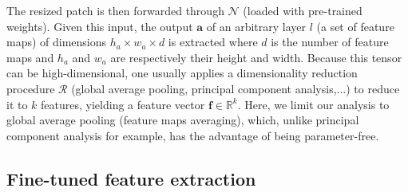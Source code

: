 
The resized patch is then forwarded through $\mathcal{N}$ (loaded with pre-trained weights). Given this input, the output $\mathbf{a}$ of an arbitrary layer $l$ (\ie a set of feature maps) of dimensions $h_a \times w_a \times d$ is extracted where $d$ is the number of feature maps and $h_a$ and $w_a$ are respectively their height and width. Because this tensor can be high-dimensional, one usually applies a dimensionality reduction procedure $\mathcal{R}$ (\eg global average pooling, principal component analysis,...) to reduce it to $k$ features, yielding a feature vector $\mathbf{f}\in \mathbb{R}^k$.  Here, we limit our analysis to global average pooling (\ie feature maps averaging), which, unlike principal component analysis for example, has the advantage of being parameter-free. %



\subsection{Fine-tuned feature extraction}
\label{ssec:comp:meth_fine_tuning}



 



